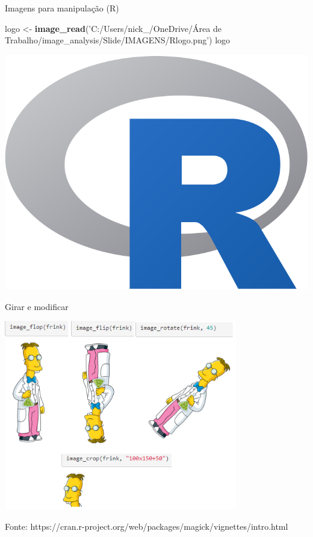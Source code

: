 \documentclass[
  ignorenonframetext,
]{beamer}
\newenvironment{Shaded}{\begin{snugshade}}{\end{snugshade}}
\newcommand{\KeywordTok}[1]{\textcolor[rgb]{0.13,0.29,0.53}{\textbf{#1}}}
\newcommand{\NormalTok}[1]{#1}
\newcommand{\StringTok}[1]{\textcolor[rgb]{0.31,0.60,0.02}{#1}}
\begin{document}
\begin{frame}[fragile]{Imagens para manipulação (R)}
\protect\hypertarget{imagens-para-manipulauxe7uxe3o-r}{}

\begin{Shaded}
\begin{Highlighting}[]
\NormalTok{logo <-}\StringTok{ }\KeywordTok{image_read}\NormalTok{(}\StringTok{'C:/Users/nick_/OneDrive/Área de Trabalho/image_analysis/Slide/IMAGENS/Rlogo.png'}\NormalTok{)}
\NormalTok{logo}
\end{Highlighting}
\end{Shaded}

\includegraphics[width=10.06in]{SLIDES_files/figure-beamer/5.1.2-1}

\end{frame}

\begin{frame}{Girar e modificar}
\protect\hypertarget{girar-e-modificar}{}

\small

\includegraphics[width=4.0in]{IMAGENS/girar_modificar}

\begin{center}
\tiny{Fonte: https://cran.r-project.org/web/packages/magick/vignettes/intro.html}
\end{center}

\end{frame}
\end{document}
